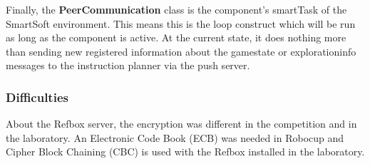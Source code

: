 Finally, the \textbf{PeerCommunication} class is the component’s smartTask of the SmartSoft environment. This means this is the loop construct which will be run as long as the component is active. At the current state, it does nothing more than sending new registered information about the gamestate or explorationinfo messages to the instruction planner via the push server.\\


\subsubsection{Difficulties}

About the Refbox server, the encryption was different in the competition and in the laboratory. An Electronic Code Book (ECB) was needed in Robocup and Cipher Block Chaining (CBC) is used with the Refbox installed in the laboratory.
